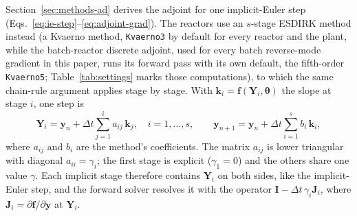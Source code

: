 \documentclass{article}
\begin{document}
Section~\ref{sec:methods-ad} derives the adjoint for one implicit-Euler step (Eqs.~\eqref{eq:ie-step}--\eqref{eq:adjoint-grad}). The reactors use an \(s\)-stage ESDIRK method instead (a Kvaerno method, \texttt{Kvaerno3} by default for every reactor and the plant, while the batch-reactor discrete adjoint, used for every batch reverse-mode gradient in this paper, runs its forward pass with its own default, the fifth-order \texttt{Kvaerno5}; Table~\ref{tab:settings} marks those computations), to which the same chain-rule argument applies stage by stage. With \(\mathbf{k}_i=\mathbf{f}(\mathbf{Y}_i,\boldsymbol{\theta})\) the slope at stage \(i\), one step is
\[
\mathbf{Y}_i=\mathbf{y}_n+\Delta t\sum_{j=1}^{i}a_{ij}\,\mathbf{k}_j,\quad i=1,\dots,s,
\qquad
\mathbf{y}_{n+1}=\mathbf{y}_n+\Delta t\sum_{i=1}^{s}b_i\,\mathbf{k}_i,
\]
where \(a_{ij}\) and \(b_i\) are the method's coefficients. The matrix \(a_{ij}\) is lower triangular with diagonal \(a_{ii}=\gamma_i\); the first stage is explicit (\(\gamma_1=0\)) and the others share one value \(\gamma\). Each implicit stage therefore contains \(\mathbf{Y}_i\) on both sides, like the implicit-Euler step, and the forward solver resolves it with the operator \(\mathbf{I}-\Delta t\,\gamma_i\mathbf{J}_i\), where \(\mathbf{J}_i=\partial\mathbf{f}/\partial\mathbf{y}\) at \(\mathbf{Y}_i\).
\end{document}
